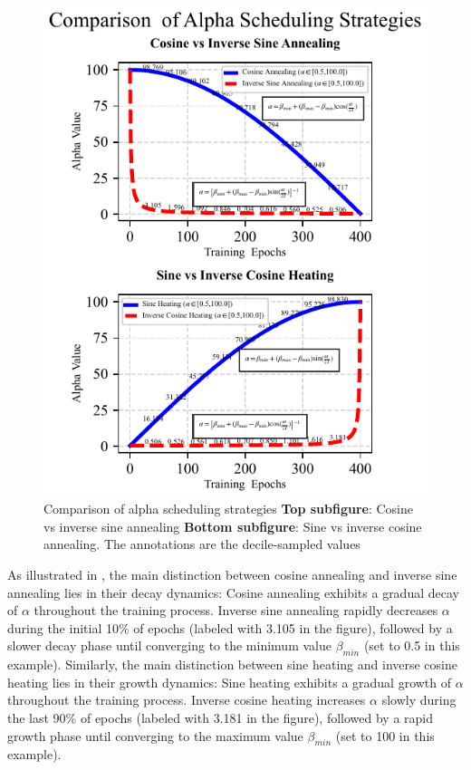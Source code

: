 \documentclass[10pt,twocolumn,letterpaper]{article}
\begin{document}
\begin{figure}[htbp]
	\center
	\vspace{-10pt} 
	\includegraphics[width=\columnwidth]{images/AlphaSch.pdf}
	\caption{Comparison of alpha scheduling strategies
	\textbf{Top subfigure}: Cosine vs inverse sine annealing
    \textbf{Bottom subfigure}: Sine vs inverse cosine annealing. The annotations are the decile-sampled values}
	\vspace{-15pt} 
	\label{fig:AlphaSch}
\end{figure}

As illustrated in , the main distinction between cosine annealing and inverse sine annealing lies in their decay dynamics: Cosine annealing exhibits a gradual decay of $\alpha$ throughout the training process. Inverse sine annealing rapidly decreases $\alpha$ during the initial 10\% of epochs (labeled with 3.105 in the figure), followed by a slower decay phase until converging to the minimum value $\beta_{min}$ (set to 0.5 in this example). Similarly, the main distinction between sine heating and inverse cosine heating lies in their growth dynamics: Sine heating exhibits a gradual growth of $\alpha$ throughout the training process. Inverse cosine heating increases $\alpha$ slowly during the last 90\% of epochs (labeled with 3.181 in the figure), followed by a rapid growth phase until converging to the maximum value $\beta_{min}$ (set to 100 in this example).
\end{document}
